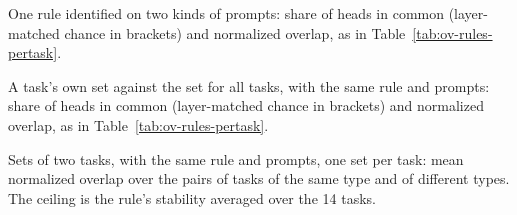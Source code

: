\documentclass[10pt,a4paper]{article}
\begin{document}
\begin{table}[H]
\centering\scriptsize\setlength{\tabcolsep}{3pt}

\caption{One rule identified on two kinds of prompts: share of heads in common (layer-matched chance in brackets) and normalized overlap, as in Table~\ref{tab:ov-rules-pertask}.}
\label{tab:ov-pools}
\end{table}

\begin{table}[H]
\centering\scriptsize\setlength{\tabcolsep}{3pt}

\caption{A task's own set against the set for all tasks, with the same rule and prompts: share of heads in common (layer-matched chance in brackets) and normalized overlap, as in Table~\ref{tab:ov-rules-pertask}.}
\label{tab:ov-scope}
\end{table}

\begin{table}[H]
\centering\scriptsize\setlength{\tabcolsep}{3pt}

\caption{Sets of two tasks, with the same rule and prompts, one set per task: mean normalized overlap over the pairs of tasks of the same type and of different types. The ceiling is the rule's stability averaged over the 14 tasks.}
\label{tab:ov-tasks}
\end{table}
\end{document}
